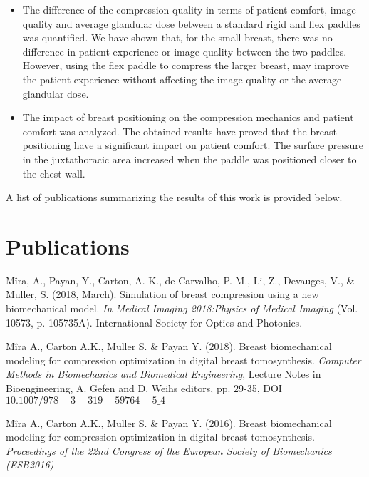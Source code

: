 \begin{itemize}
\item The difference of the compression quality in terms of patient comfort, image quality and average glandular dose between a standard rigid and flex paddles was quantified. We have shown that, for the small breast, there was no difference in patient experience or image quality between the two paddles. However, using the flex paddle to compress the larger breast, may improve the patient experience without affecting the image quality or the average glandular dose.
\item The impact of breast positioning on the compression mechanics and patient comfort was analyzed. The obtained results have proved that the breast positioning have a significant impact on patient comfort. The surface pressure in the juxtathoracic area increased when the paddle was positioned closer to the chest wall.
\end{itemize}
A list of publications summarizing the results of this work is provided below.
\cleardoublepage
 
\chapter*{Publications}\label{section:publications}

\begin{description}

\item  Mîra, A., Payan, Y., Carton, A. K., de Carvalho, P. M., Li, Z., Devauges, V., \& Muller, S. (2018, March). Simulation of breast compression using a new biomechanical model. \textit {In Medical Imaging 2018:Physics of Medical Imaging} (Vol. 10573, p. 105735A). International Society for Optics and Photonics. \\

\item  Mîra A., Carton A.K., Muller S. \& Payan Y. (2018). Breast biomechanical modeling for compression optimization in digital breast tomosynthesis. \textit{Computer Methods in Biomechanics and Biomedical Engineering}, Lecture Notes in Bioengineering, A. Gefen and D. Weihs editors, pp. 29-35, DOI $10.1007/978-3-319-59764-5\_4$ \\

\item  Mîra A., Carton A.K., Muller S. \& Payan Y. (2016). Breast biomechanical modeling for compression optimization in digital breast tomosynthesis. \textit{Proceedings of the 22nd Congress of the European Society of Biomechanics (ESB2016)}
\end{description}

\cleardoublepage